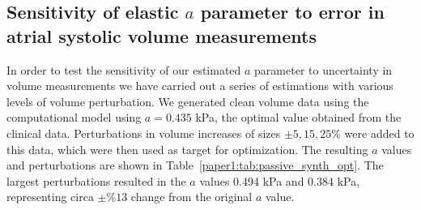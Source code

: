 \subsection{Sensitivity of elastic $a$ parameter to error in atrial systolic volume measurements}
In order to test the sensitivity of our estimated $a$ parameter to
uncertainty in volume measurements we have carried out a series of estimations with
various levels of volume perturbation. 
We generated clean volume data using the computational model using $a = 0.435$ kPa, 
the optimal value obtained from the clinical data. Perturbations in volume increases
of sizes $\pm 5,15, 25 \%$ were added to this data,
which were then used as target for optimization. The resulting $a$ values and perturbations
are shown in Table~\ref{paper1:tab:passive_synth_opt}. The largest perturbations resulted
in the $a$ values 0.494 kPa and 0.384 kPa, representing circa $\pm \%13$ change from the original $a$ value.


